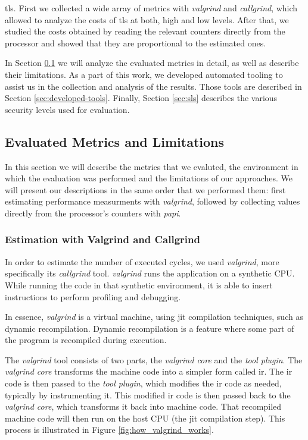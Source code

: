 \gls{tls}. First we collected a wide array of metrics with \textit{valgrind} and \textit{callgrind}, which allowed to
analyze the costs of \gls{tls} at both, high and low levels. After that, we studied the costs obtained by reading
the relevant counters directly from the processor and showed that they are proportional to the estimated ones.

In Section \ref{sec:eval-metrics-and-lims} we will analyze the evaluated metrics in detail, as well as describe their limitations.
As a part of this work, we developed automated tooling to assist us in the collection and analysis of the results. Those
tools are described in Section \ref{sec:developed-tools}. Finally, Section \ref{sec:sls} describes the various security levels used for evaluation. 

\subsection{Evaluated Metrics and Limitations} \label{sec:eval-metrics-and-lims}

In this section we will describe the metrics that we evaluted, the environment in which the evaluation
was performed and the limitations of our approaches. We will present our descriptions in the same order
that we performed them: first estimating performance measurments with \textit{valgrind}, followed
by collecting values directly from the processor's counters with \textit{papi}.

\subsubsection{Estimation with Valgrind and Callgrind}

In order to estimate the number of executed cycles, we used \textit{valgrind}, more specifically
    its \textit{callgrind} tool. \textit{valgrind} runs the application on a synthetic CPU.
While running the code in that synthetic environment, it is able to insert instructions to perform
profiling and debugging.

In essence, \textit{valgrind} is a virtual machine, using \gls{jit}
compilation techniques, such as dynamic recompilation. Dynamic recompilation is a
feature where some part of the program is recompiled during execution.

The \textit{valgrind} tool consists of two parts, the \textit{valgrind core} and the \textit{tool
plugin}. The \textit{valgrind core} transforms the machine code into a simpler form called
\gls{ir}. The \gls{ir} code is then passed to the \textit{tool plugin}, which modifies the
\gls{ir} code as needed, typically by instrumenting it. This modified \gls{ir} code is then passed back to the
\textit{valgrind core}, which transforms it back into machine code. That recompiled machine code  will then run on the
host CPU (the \gls{jit} compilation step). This process is illustrated in Figure \ref{fig:how_valgrind_works}.


